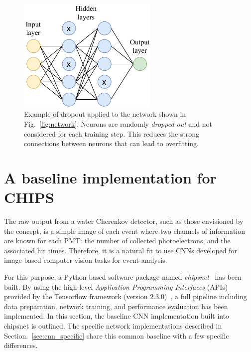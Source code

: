 \begin{figure} %
    \includegraphics[width=0.6\textwidth]{diagrams/6-cnn/dropout.pdf}
    \caption[Example of dropout applied to a neural network]
    {Example of dropout applied to the network shown in Fig.~\ref{fig:network}. Neurons are
        randomly \emph{dropped out} and not considered for each training step. This reduces the
        strong connections between neurons that can lead to overfitting.}
    \label{fig:dropout}
\end{figure}

\section{A baseline implementation for CHIPS} %
\label{sec:cnn_baseline} %

The raw output from a water Cherenkov detector, such as those envisioned by the \chips concept, is
a simple image of each event where two channels of information are known for each PMT: the number
of collected photoelectrons, and the associated hit times. Therefore, it is a natural fit to use
CNNs developed for image-based computer vision tasks for \chips event analysis.

For this purpose, a Python-based software package named \emph{chipsnet}~\cite{chipsnet2020} has
been built. By using the high-level \emph{Application Programming Interfaces} (APIs) provided by
the Tensorflow framework (version 2.3.0)~\cite{tf2015}, a full pipeline including data
preparation, network training, and performance evaluation has been implemented. In this section,
the baseline CNN implementation built into chipsnet is outlined. The specific network
implementations described in Section.~\ref{sec:cnn_specific} share this common baseline with a few
specific differences.

